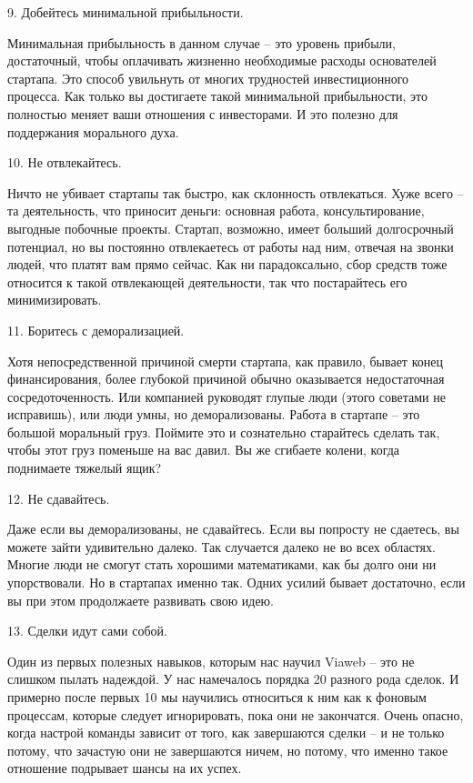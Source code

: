 \documentclass[ebook,12pt,oneside,openany]{memoir}
\begin{document}
9. Добейтесь минимальной прибыльности.

Минимальная прибыльность в данном случае – это уровень прибыли,
достаточный, чтобы оплачивать жизненно необходимые расходы основателей
стартапа. Это способ увильнуть от многих трудностей инвестиционного
процесса. Как только вы достигаете такой минимальной прибыльности, это
полностью меняет ваши отношения с инвесторами. И это полезно для
поддержания морального духа.

10. Не отвлекайтесь.

Ничто не убивает стартапы так быстро, как склонность отвлекаться. Хуже
всего – та деятельность, что приносит деньги: основная работа,
консультирование, выгодные побочные проекты. Стартап, возможно, имеет
больший долгосрочный потенциал, но вы постоянно отвлекаетесь от работы
над ним, отвечая на звонки людей, что платят вам прямо сейчас. Как ни
парадоксально, сбор средств тоже относится к такой отвлекающей
деятельности, так что постарайтесь его минимизировать.

11. Боритесь с деморализацией.

Хотя непосредственной причиной смерти стартапа, как правило, бывает
конец финансирования, более глубокой причиной обычно оказывается
недостаточная сосредоточенность. Или компанией руководят глупые люди
(этого советами не исправишь), или люди умны, но деморализованы.
Работа в стартапе – это большой моральный груз. Поймите это и
сознательно старайтесь сделать так, чтобы этот груз поменьше на вас
давил. Вы же сгибаете колени, когда поднимаете тяжелый ящик?

12. Не сдавайтесь.

Даже если вы деморализованы, не сдавайтесь. Если вы попросту не
сдаетесь, вы можете зайти удивительно далеко. Так случается далеко не
во всех областях. Многие люди не смогут стать хорошими математиками,
как бы долго они ни упорствовали. Но в стартапах именно так. Одних
усилий бывает достаточно, если вы при этом продолжаете развивать свою
идею.

13. Сделки идут сами собой.

Один из первых полезных навыков, которым нас научил Viaweb – это не
слишком пылать надеждой. У нас намечалось порядка 20 разного рода
сделок. И примерно после первых 10 мы научились относиться к ним как к
фоновым процессам, которые следует игнорировать, пока они не
закончатся. Очень опасно, когда настрой команды зависит от того, как
завершаются сделки – и не только потому, что зачастую они не
завершаются ничем, но потому, что именно такое отношение подрывает
шансы на их успех.
\end{document}
